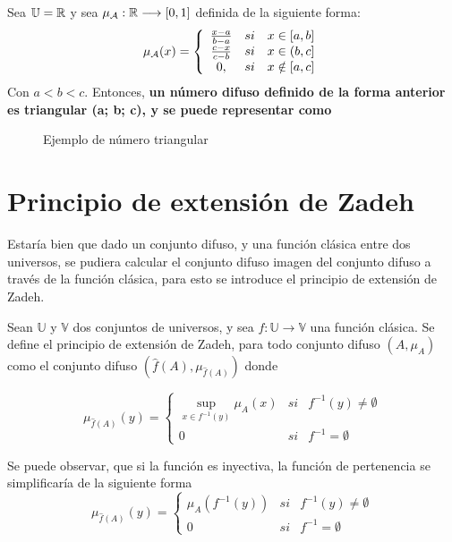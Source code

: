   \begin{ejemplo}
    Sea $\mathbb U=\mathbb R$ y sea $\mu_\mathcal{A}: \mathbb R \longrightarrow [0, 1]$ definida de la siguiente forma:
    $$
    \mu_\mathcal{A}(x)=\left\{
    \begin{array}{c c c}
      \frac{x-a}{b-a} & si & x \in [a, b] \\
      \frac{c-x}{c-b} & si & x \in (b, c] \\
	0, & si & x \notin [a, c]
    \end{array}
    \right.
    $$
    Con $a < b < c$. Entonces, \textbf{un número difuso definido de la forma anterior es triangular (a; b; c), y se puede representar como} 
    
    \begin{figure}[h]
      \centering
      \caption{Ejemplo de número triangular}
      \label{fig:numero_difuso}
    \end{figure}
    
  \end{ejemplo}


  \section{Principio de extensión de Zadeh}
  Estaría bien que dado un conjunto difuso, y una función clásica entre dos universos, se pudiera calcular el conjunto difuso imagen del conjunto difuso a través de la función clásica, para esto se introduce el principio de extensión de Zadeh.

  \begin{definicion}
  	\label{def:zadeh}
    Sean $\mathbb{U}$ y $\mathbb{V}$ dos conjuntos de universos, y sea $f: \mathbb{U} \longrightarrow \mathbb{V}$ una función clásica. Se define el principio de extensión de Zadeh, para todo conjunto difuso $(A, \mu_A)$ como el conjunto difuso $(\hat{f}(A), \mu_{\hat{f}(A)})$ donde
    
    $$
    \mu_{\hat{f}(A)}(y)=\left\{
    \begin{array}{ccc}
      \sup_{x\in f^{-1}(y)} \mu_A(x) & si & f^{-1}(y)\neq\emptyset\\
      0 & si & f^{-1}=\emptyset
    \end{array}
    \right.
    $$
  \end{definicion}


  Se puede observar, que si la función es inyectiva, la función de pertenencia se simplificaría de la siguiente forma
  $$
  \mu_{\hat{f}(A)}(y)=\left\{
  \begin{array}{ccc}
    \mu_A(f^{-1}(y)) & si & f^{-1}(y)\neq\emptyset\\
    0 & si & f^{-1}=\emptyset
  \end{array}
  \right.
  $$

